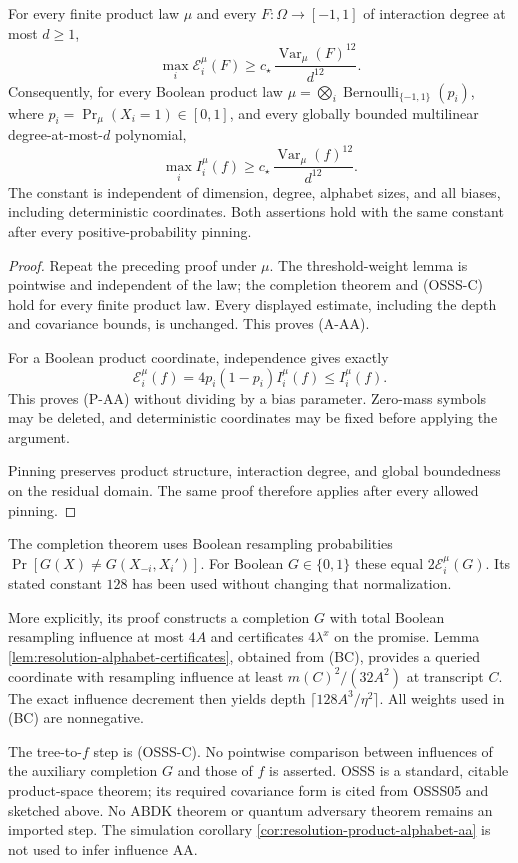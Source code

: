 \begin{corollary}
\label{ian:product-influence-aa-proved}
For every finite product law \(\mu\) and every
\(F:\Omega\to[-1,1]\) of interaction degree at most \(d\ge1\),
\[
 \max_i\mathcal E_i^\mu(F)
 \ge c_\star\,
       \frac{\operatorname{Var}_\mu(F)^{12}}{d^{12}}.
 \tag{A-AA}
\]
Consequently, for every Boolean product law
\(\mu=\bigotimes_i\operatorname{Bernoulli}_{\{-1,1\}}(p_i)\),
where \(p_i=\Pr_\mu(X_i=1)\in[0,1]\),
and every globally bounded multilinear degree-at-most-\(d\) polynomial,
\[
 \max_i I_i^\mu(f)
 \ge c_\star\,
       \frac{\operatorname{Var}_\mu(f)^{12}}{d^{12}}.
 \tag{P-AA}
\]
The constant is independent of dimension, degree, alphabet sizes,
and all biases, including deterministic coordinates.
Both assertions hold with the same constant after every
positive-probability pinning.
\end{corollary}

\begin{proof}
Repeat the preceding proof under \(\mu\).
The threshold-weight lemma is pointwise and independent of the law;
the completion theorem and (OSSS-C) hold for every finite product
law. Every displayed estimate, including the depth and covariance
bounds, is unchanged. This proves (A-AA).

For a Boolean product coordinate, independence gives exactly
\[
 \mathcal E_i^\mu(f)=4p_i(1-p_i)I_i^\mu(f)\le I_i^\mu(f).
\]
This proves (P-AA) without dividing by a bias parameter.
Zero-mass symbols may be deleted, and deterministic coordinates may
be fixed before applying the argument.

Pinning preserves product structure, interaction degree, and global
boundedness on the residual domain. The same proof therefore applies
after every allowed pinning.
\end{proof}

\begin{remark}
\label{ian:influence-aa-dependencies}
The completion theorem uses Boolean resampling probabilities
\(\Pr[G(X)\ne G(X_{-i},X_i')]\). For Boolean \(G\in\{0,1\}\)
these equal \(2\mathcal E_i^\mu(G)\). Its stated constant \(128\)
has been used without changing that normalization.

More explicitly, its proof constructs a completion \(G\) with total
Boolean resampling influence at most \(4A\) and certificates
\(4\lambda^x\) on the promise. Lemma
\ref{lem:resolution-alphabet-certificates}, obtained from (BC),
provides a queried coordinate with resampling influence at least
\(m(C)^2/(32A^2)\) at transcript \(C\). The exact influence decrement
then yields depth \(\lceil128A^3/\eta^2\rceil\).
All weights used in (BC) are nonnegative.

The tree-to-\(f\) step is (OSSS-C). No pointwise comparison between
influences of the auxiliary completion \(G\) and those of \(f\) is
asserted. OSSS is a standard, citable product-space theorem; its
required covariance form is cited from OSSS05 and sketched above.
No ABDK theorem or quantum adversary theorem remains an imported
step. The simulation corollary
\ref{cor:resolution-product-alphabet-aa} is not used to infer
influence AA.
\end{remark}
